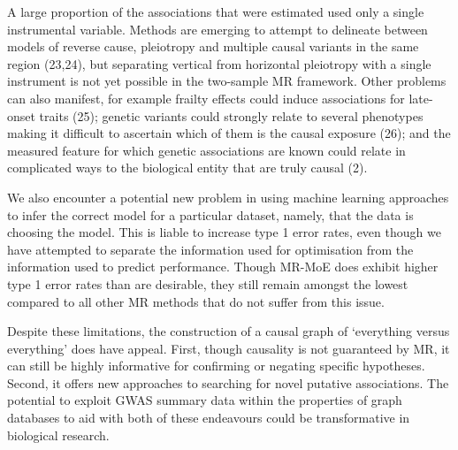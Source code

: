 \documentclass[]{article}
\begin{document}
A large proportion of the associations that were estimated used only a
single instrumental variable. Methods are emerging to attempt to
delineate between models of reverse cause, pleiotropy and multiple
causal variants in the same region (23,24), but separating vertical from
horizontal pleiotropy with a single instrument is not yet possible in
the two-sample MR framework. Other problems can also manifest, for
example frailty effects could induce associations for late-onset traits
(25); genetic variants could strongly relate to several phenotypes
making it difficult to ascertain which of them is the causal exposure
(26); and the measured feature for which genetic associations are known
could relate in complicated ways to the biological entity that are truly
causal (2).

We also encounter a potential new problem in using machine learning
approaches to infer the correct model for a particular dataset, namely,
that the data is choosing the model. This is liable to increase type 1
error rates, even though we have attempted to separate the information
used for optimisation from the information used to predict performance.
Though MR-MoE does exhibit higher type 1 error rates than are desirable,
they still remain amongst the lowest compared to all other MR methods
that do not suffer from this issue.

Despite these limitations, the construction of a causal graph of
`everything versus everything' does have appeal. First, though causality
is not guaranteed by MR, it can still be highly informative for
confirming or negating specific hypotheses. Second, it offers new
approaches to searching for novel putative associations. The potential
to exploit GWAS summary data within the properties of graph databases to
aid with both of these endeavours could be transformative in biological
research.

\newpage
\end{document}
